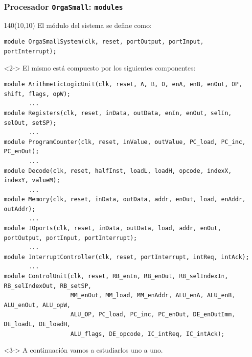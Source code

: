 \documentclass[aspectratio=169]{beamer}
\begin{document}
\begin{frame}[fragile,t]
    \frametitle{Procesador \texttt{OrgaSmall}: \texttt{modules}}
    \begin{textblock}{140}(10,10)
    El módulo del sistema se define como:
\lstset{basicstyle=\tiny}
\begin{lstlisting}
module OrgaSmallSystem(clk, reset, portOutput, portInput, portInterrupt);
\end{lstlisting}
    \begin{onlyenv}<2->
    El mismo está compuesto por los siguientes componentes:
\lstset{basicstyle=\tiny}
\begin{lstlisting}
module ArithmeticLogicUnit(clk, reset, A, B, O, enA, enB, enOut, OP, shift, flags, opW);
       ...
module Registers(clk, reset, inData, outData, enIn, enOut, selIn, selOut, setSP);
       ...
module ProgramCounter(clk, reset, inValue, outValue, PC_load, PC_inc, PC_enOut);
       ...
module Decode(clk, reset, halfInst, loadL, loadH, opcode, indexX, indexY, valueM);
       ...
module Memory(clk, reset, inData, outData, addr, enOut, load, enAddr, outAddr);
       ...
module IOports(clk, reset, inData, outData, load, addr, enOut, portOutput, portInput, portInterrupt);
       ...
module InterruptController(clk, reset, portInterrupt, intReq, intAck);
       ...
module ControlUnit(clk, reset, RB_enIn, RB_enOut, RB_selIndexIn, RB_selIndexOut, RB_setSP,
                   MM_enOut, MM_load, MM_enAddr, ALU_enA, ALU_enB, ALU_enOut, ALU_opW,
                   ALU_OP, PC_load, PC_inc, PC_enOut, DE_enOutImm, DE_loadL, DE_loadH,
                   ALU_flags, DE_opcode, IC_intReq, IC_intAck);
\end{lstlisting}
    \end{onlyenv}
    \begin{onlyenv}<3->
    A continuación vamos a estudiarlos uno a uno.
    \end{onlyenv}
    \end{textblock}
\end{frame}
\end{document}
